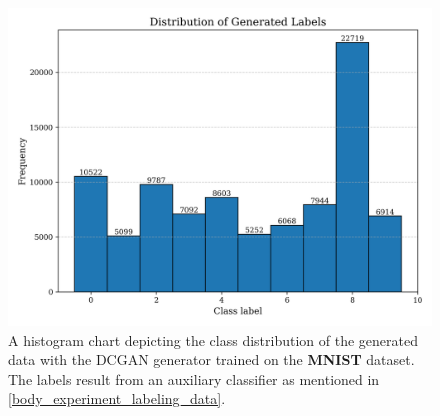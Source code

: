 \begin{figure}[htbp]
    \centering
    \includegraphics[width=.9\textwidth]{abb/datageneration_histograms/dc_mnist.png}
    \caption{A histogram chart depicting the class distribution of the generated data with the DCGAN generator trained on the \textbf{MNIST} dataset. The labels result from an auxiliary classifier as mentioned in \ref{body_experiment_labeling_data}.}
    \label{fig:figure_dcgan_datacreation_histogram}
\end{figure}
